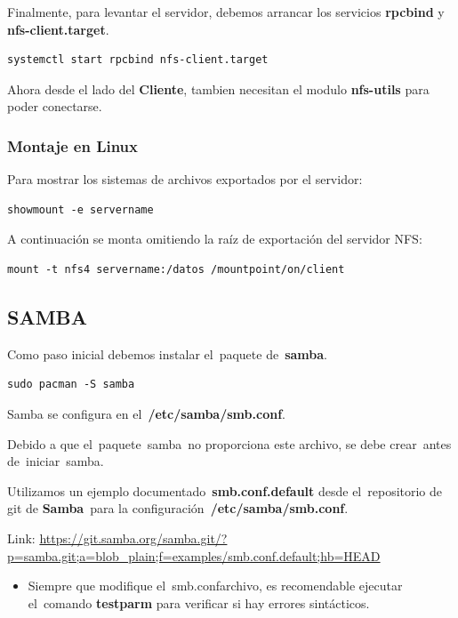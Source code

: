 \documentclass[12pt]{extarticle}
\providecommand{\tightlist}{%
      \setlength{\itemsep}{0pt}\setlength{\parskip}{0pt}}
\begin{document}
Finalmente, para levantar el servidor, debemos arrancar los servicios
\textbf{rpcbind} y \textbf{nfs-client.target}.

\begin{verbatim}
systemctl start rpcbind nfs-client.target
\end{verbatim}

Ahora desde el lado del \textbf{Cliente}, tambien necesitan el modulo
\textbf{nfs-utils} para poder conectarse.

\subsubsection{Montaje en Linux}\label{montaje-en-linux}

Para mostrar los sistemas de archivos exportados por el servidor:

\begin{verbatim}
showmount -e servername
\end{verbatim}

A continuación se monta omitiendo la raíz de exportación del servidor
NFS:

\begin{verbatim}
mount -t nfs4 servername:/datos /mountpoint/on/client
\end{verbatim}

\subsection{SAMBA}\label{samba}

Como paso inicial debemos instalar el~paquete de~\textbf{samba}.

\begin{verbatim}
sudo pacman -S samba
\end{verbatim}

Samba se configura en el~\textbf{/etc/samba/smb.conf}.

Debido a que el~paquete~samba~no proporciona este archivo, se debe
crear~antes de~iniciar~samba.

Utilizamos un ejemplo documentado~\textbf{smb.conf.default} desde
el~repositorio de git de \textbf{Samba}~para la
configuración~\textbf{/etc/samba/smb.conf}.

Link:
\url{https://git.samba.org/samba.git/?p=samba.git;a=blob_plain;f=examples/smb.conf.default;hb=HEAD}

\begin{itemize}
\tightlist
\item
  Siempre que modifique el~smb.confarchivo, es recomendable ejecutar
  el~comando \textbf{testparm} para verificar si hay errores
  sintácticos.
\end{itemize}
\end{document}
